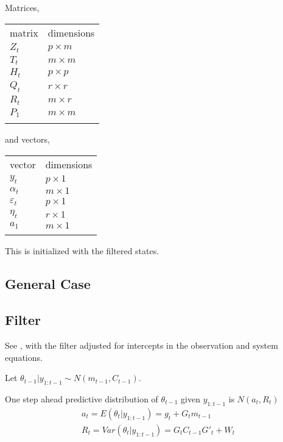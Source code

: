 \documentclass{article}
\begin{document}
Matrices,
\begin{longtable}[c]{@{}ll@{}}
\hline\noalign{\medskip}
matrix & dimensions
\\\noalign{\medskip}
\hline\noalign{\medskip}
$Z_t$ & $p \times m$
\\\noalign{\medskip}
$T_t$ & $m \times m$
\\\noalign{\medskip}
$H_t$ & $p \times p$
\\\noalign{\medskip}
$Q_t$ & $r \times r$
\\\noalign{\medskip}
$R_t$ & $m \times r$
\\\noalign{\medskip}
$P_1$ & $m \times m$
\\\noalign{\medskip}
\hline
\end{longtable}
and vectors,
\begin{longtable}[c]{@{}ll@{}}
\hline\noalign{\medskip}
vector & dimensions
\\\noalign{\medskip}
\hline\noalign{\medskip}
$y_t$ & $p \times 1$
\\\noalign{\medskip}
$\alpha_t$ & $m \times 1$
\\\noalign{\medskip}
$\varepsilon_t$ & $p \times 1$
\\\noalign{\medskip}
$\eta_t$ & $r \times 1$
\\\noalign{\medskip}
$a_1$ & $m \times 1$
\\\noalign{\medskip}
\hline
\end{longtable}

This is initialized with the filtered states.

\subsection{General Case}
\label{sec:general-case}

\subsection{Filter}

See \textcite[Chapter 2.7, p. 53]{PetrisPetroneEtAl2009}, with the filter adjusted for intercepts in the observation and system equations.

Let $\theta_{t-1} | y_{1:t-1} \sim N(m_{t-1}, C_{t-1})$.

One step ahead predictive distribution of $\theta_{t-1}$ given $y_{1:t-1}$ is $N(a_{t}, R_{t})$
\begin{align*}
  a_{t} = E(\theta_{t} | y_{1:t-1}) = g_{t} + G_{t} m_{t-1} \\
  R_{t} = Var(\theta_{t} | y_{1:t-1}) = G_{t} C_{t-1} G'_{t} + W_{t}
\end{align*}
\end{document}

